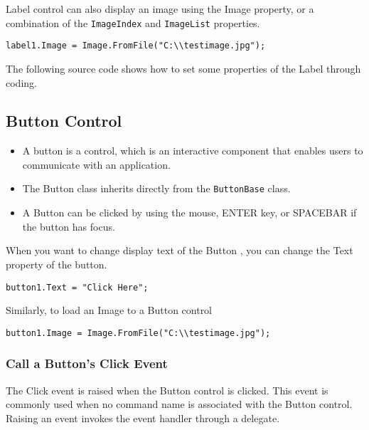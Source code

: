 Label control can also display an image using the Image property, or a combination of the \texttt{ImageIndex} and \texttt{ImageList} properties.

\begin{lstlisting}[numbers=none]
	label1.Image = Image.FromFile("C:\\testimage.jpg");
\end{lstlisting}

The following {\cs} source code shows how to set some properties of the Label through coding.




\subsection{Button Control}
\begin{itemize}
	\item A button is a control, which is an interactive component that enables users to communicate with an application. 
	\item The Button class inherits directly from the \texttt{ButtonBase} class. 
	\item A Button can be clicked by using the mouse, ENTER key, or SPACEBAR if the button has focus.
\end{itemize}


When you want to change display text of the Button , you can change the Text property of the button.

\begin{lstlisting}[numbers=none]
	button1.Text = "Click Here";
\end{lstlisting}

Similarly, to load an Image to a Button control

\begin{lstlisting}[numbers=none]
	button1.Image = Image.FromFile("C:\\testimage.jpg");
\end{lstlisting}



\subsubsection*{Call a Button's Click Event}
The Click event is raised when the Button control is clicked. This event is commonly used when no command name is associated with the Button control. Raising an event invokes the event handler through a delegate.


